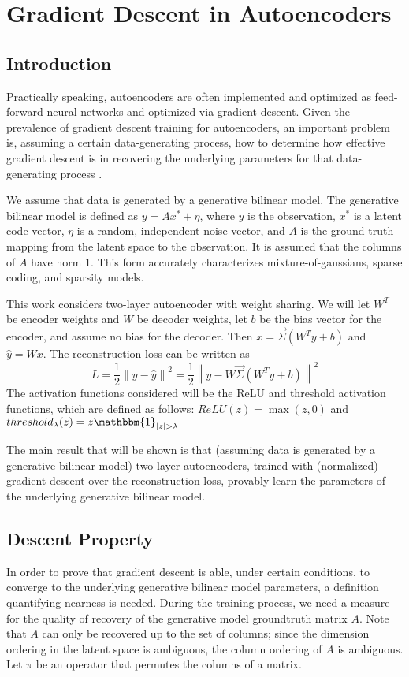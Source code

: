 
\section{Gradient Descent in Autoencoders}
\subsection{Introduction}
Practically speaking, autoencoders are often implemented and
optimized as feed-forward neural networks and optimized via gradient
descent. Given the prevalence of gradient descent training for
autoencoders, an important problem is, assuming a certain
data-generating process, how to determine how effective gradient
descent is in recovering the underlying parameters for that
data-generating process \cite{nguyen2019dynamics}.

We assume that data is generated by a generative bilinear model. The
generative bilinear model is defined as $y=Ax^* + \eta$, where $y$ is
the observation, $x^*$ is a latent code vector, $\eta$ is a random,
independent noise vector, and $A$ is the ground truth mapping from
the latent space to the observation. It is assumed that the columns
of $A$ have norm 1. This form accurately characterizes
mixture-of-gaussians, sparse coding, and sparsity models.

This work considers two-layer autoencoder with weight sharing. We
will let $W^T$ be encoder weights and $W$ be decoder weights, let $b$
be the bias vector for the encoder, and assume no bias for the
decoder. Then $x = \vec{\Sigma}(W^T y + b)$ and $\hat{y} = Wx$. The
reconstruction loss can be written as $$L = \frac{1}{2} \left \lVert
y - \hat{y} \right \rVert^2 = \frac{1}{2} \left \lVert y - W
\vec{\Sigma}(W^T y + b) \right \rVert ^2$$ The activation functions
considered will be the ReLU and threshold activation functions, which
are defined as follows: $ReLU(z) = \max(z,0)$ and
$threshold_{\lambda} (z) = z \mathbbm{1}_{|z| > \lambda}$

The main result that will be shown is that (assuming data is
generated by a generative bilinear model) two-layer autoencoders,
trained with (normalized) gradient descent over the reconstruction
loss, provably learn the parameters of the underlying generative
bilinear model.

\subsection{Descent Property}
In order to prove that gradient descent is able, under certain
conditions, to converge to the underlying generative bilinear model
parameters, a definition quantifying nearness is needed. During the
training process, we need a measure for the quality of recovery of
the generative model groundtruth matrix $A$. Note that $A$ can only
be recovered up to the set of columns; since the dimension ordering
in the latent space is ambiguous, the column ordering of $A$ is
ambiguous. Let $\pi$ be an operator that permutes the columns of a
matrix.

